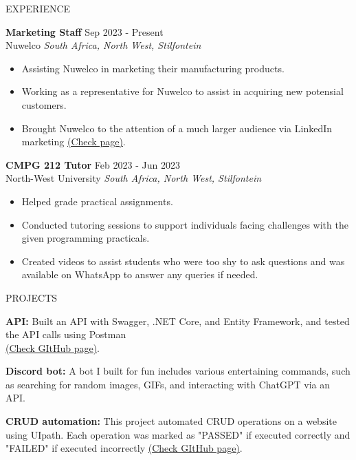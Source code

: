 \documentclass{resume} %
\begin{document}
\begin{rSection}{EXPERIENCE}

\textbf{Marketing Staff} \hfill Sep 2023 - Present\\
Nuwelco \hfill \textit{South Africa, North West, Stilfontein}
 \begin{itemize}
    \itemsep -3pt {} 
     \item Assisting Nuwelco in marketing their manufacturing products.
     \item Working as a representative for Nuwelco to assist in acquiring new potensial customers.
     \item Brought Nuwelco to the attention of a much larger audience via LinkedIn marketing \href{https://www.linkedin.com/company/98936614/admin/feed/posts/}{(Check page)}.
 \end{itemize}
 
\textbf{CMPG 212 Tutor} \hfill Feb 2023 - Jun 2023\\
North-West University \hfill \textit{South Africa, North West, Stilfontein}
 \begin{itemize}
    \itemsep -3pt {} 
     \item Helped grade practical assignments.
     \item Conducted tutoring sessions to support individuals facing challenges with the given programming practicals.
     \item Created videos to assist students who were too shy to ask questions and was available on WhatsApp to answer any queries if needed.
 \end{itemize}

\end{rSection} 


\begin{rSection}{PROJECTS}
\vspace{-1.25em}
\item \textbf{API:} {Built an API with Swagger, .NET Core, and Entity Framework, and tested the API calls using Postman\\ \href{https://github.com/XoXoTheFrozenFox/CMPG323_Project2_39909476}{(Check GItHub page)}}.
\item \textbf{Discord bot:} {A bot I built for fun includes various entertaining commands, such as searching for random images, GIFs, and interacting with ChatGPT via an API.}
\item \textbf{CRUD automation:} {This project automated CRUD operations on a website using UIpath. Each operation was marked as "PASSED" if executed correctly and "FAILED" if executed incorrectly \href{https://github.com/XoXoTheFrozenFox/CMPG323_Project4_39909476}{(Check GItHub page)}.}
\end{rSection} 
\end{document}

